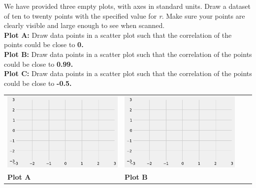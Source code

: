 \begin{enumerate}
    
    

    \clearpage
     We have provided three empty plots, with axes in standard units. Draw a dataset of ten to twenty points with the specified value for \textit{r}. Make sure your points are clearly visible and large enough to see when scanned.\\[8pt]
    \textbf{Plot A:} Draw data points in a scatter plot such that the correlation of the points could be close to \textbf{0.}\\
    \textbf{Plot B:} Draw data points in a scatter plot such that the correlation of the points could be close to \textbf{0.99.}\\
    \textbf{Plot C:} Draw data points in a scatter plot such that the correlation of the points could be close to \textbf{-0.5.}\\
    \vskip 0.4in
    \solutionimage
    {
    \begin{tabular}{l@{\hskip 1in}l@{\hskip 0.1in}l@{\hskip 0.1in}l}
    \includegraphics[scale=.45]{figures/blankaxes.png}
    &\includegraphics[scale=.45]{figures/blankaxes.png}\\
    {\hskip 1in}\textbf{Plot A}
    &{\hskip 1in}\textbf{Plot B}

\end{tabular}}
\end{enumerate}
